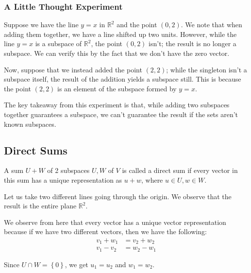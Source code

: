\documentclass[openany]{book}
\newcommand{\RR}{\mathbb{R}}
\begin{document}
	\subsubsection{A Little Thought Experiment}
	Suppose we have the line $y = x$ in $\RR^{2}$ and the point $(0,2)$. We note that when adding them together, we have a line shifted up two units. However, while the line $y=x$ is a subspace of $\RR^{2}$, the point $(0,2)$ isn't; the result is no longer a subspace. We can verify this by the fact that we don't have the zero vector.
	
	Now, suppose that we instead added the point $(2,2)$; while the singleton isn't a subspace itself, the result of the addition yields a subspace still. This is because the point $(2,2)$ is an element of the subspace formed by $y=x$.
	
	\begin{rmk}
		The key takeaway from this experiment is that, while adding two subspaces together guarantees a subspace, we can't guarantee the result if the sets aren't known subspaces.
	\end{rmk}
	
	\subsection{Direct Sums}
	\begin{defn}
		A sum $U + W$ of 2 subspaces $U, W$ of $V$ is called a direct sum if every vector in this sum has a unique representation as $u+w$, where $u \in U, w \in W$.
	\end{defn}
	\begin{example}
		Let us take two different lines going through the origin. We observe that the result is the entire plane $\RR^{2}$. 
		
		We observe from here that every vector has a unique vector representation because if we have two different vectors, then we have the following:
		\begin{align*}
			v_{1} + w_{1} &= v_{2} + w_{2} \\
			v_{1} - v_{2} &= w_{2} - w_{1}
		\end{align*}
		
		Since $U \cap W = \left\{  0\right\}$, we get $u_{1} = u_{2}$ and $w_{1} = w_{2}$.
	\end{example}
	
\end{document}
